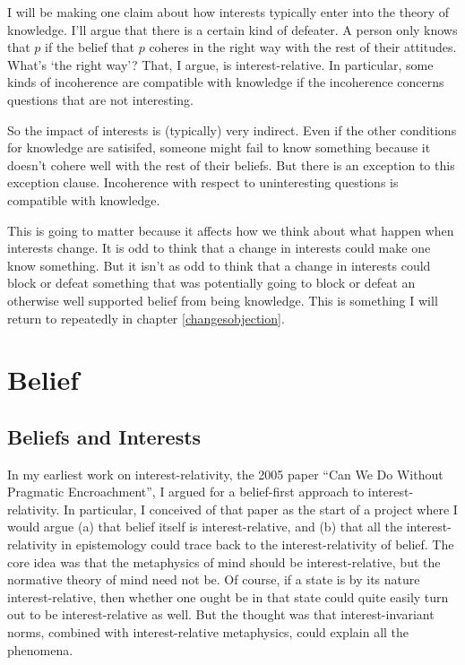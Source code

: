 \documentclass[11pt,]{book}
\begin{document}
I will be making one claim about how interests typically enter into the theory of knowledge. I'll argue that there is a certain kind of defeater. A person only knows that \(p\) if the belief that \(p\) coheres in the right way with the rest of their attitudes. What's `the right way'? That, I argue, is interest-relative. In particular, some kinds of incoherence are compatible with knowledge if the incoherence concerns questions that are not interesting.

So the impact of interests is (typically) very indirect. Even if the other conditions for knowledge are satisifed, someone might fail to know something because it doesn't cohere well with the rest of their beliefs. But there is an exception to this exception clause. Incoherence with respect to uninteresting questions is compatible with knowledge.

This is going to matter because it affects how we think about what happen when interests change. It is odd to think that a change in interests could make one know something. But it isn't as odd to think that a change in interests could block or defeat something that was potentially going to block or defeat an otherwise well supported belief from being knowledge. This is something I will return to repeatedly in chapter \ref{changesobjection}.

\hypertarget{belief}{%
\chapter{Belief}\label{belief}}

\hypertarget{beliefsinterests}{%
\section{Beliefs and Interests}\label{beliefsinterests}}

In my earliest work on interest-relativity, the 2005 paper ``Can We Do Without Pragmatic Encroachment'', I argued for a belief-first approach to interest-relativity. In particular, I conceived of that paper as the start of a project where I would argue (a) that belief itself is interest-relative, and (b) that all the interest-relativity in epistemology could trace back to the interest-relativity of belief. The core idea was that the metaphysics of mind should be interest-relative, but the normative theory of mind need not be. Of course, if a state is by its nature interest-relative, then whether one ought be in that state could quite easily turn out to be interest-relative as well. But the thought was that interest-invariant norms, combined with interest-relative metaphysics, could explain all the phenomena.
\end{document}
